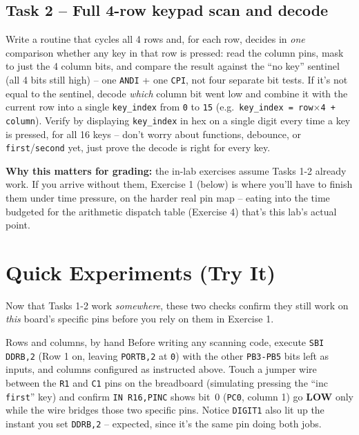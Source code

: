 \documentclass[11pt]{article}
\begin{document}
\subsection*{Task 2 -- Full 4-row keypad scan and decode}
Write a routine that cycles all 4 rows and, for each row, decides in \emph{one}
comparison whether any key in that row is pressed: read the column pins, mask
to just the 4 column bits, and compare the result against the ``no key''
sentinel (all 4 bits still high) -- one \texttt{ANDI} + one \texttt{CPI}, not
four separate bit tests. If it's not equal to the sentinel, decode \emph{which}
column bit went low and combine it with the current row into a single
\texttt{key\_index} from \texttt{0} to \texttt{15} (e.g.\
\texttt{key\_index = row}$\times$\texttt{4 + column}). Verify by displaying
\texttt{key\_index} in hex on a single digit every time a key is pressed, for
all 16 keys -- don't worry about functions, debounce, or
\texttt{first}/\texttt{second} yet, just prove the decode is right for every
key.

\medskip
\textbf{Why this matters for grading:} the in-lab exercises assume Tasks 1-2
already work. If you arrive without them, Exercise 1 (below) is where you'll
have to finish them under time pressure, on the harder real pin map -- eating
into the time budgeted for the arithmetic dispatch table (Exercise 4) that's
this lab's actual point.

\section*{Quick Experiments (Try It)}
Now that Tasks 1-2 work \emph{somewhere}, these two checks confirm they still
work on \emph{this} board's specific pins before you rely on them in Exercise 1.

\begin{tryit}{Rows and columns, by hand}
Before writing any scanning code, execute \texttt{SBI DDRB,2} (Row 1 on, leaving
\texttt{PORTB,2} at \texttt{0}) with the other \texttt{PB3-PB5} bits left as
inputs, and columns configured as instructed above. Touch a jumper wire between
the \texttt{R1} and \texttt{C1} pins on the breadboard (simulating pressing the
``inc \texttt{first}'' key) and confirm \texttt{IN R16,PINC} shows bit~0
(\texttt{PC0}, column 1) go \textbf{LOW} only while the wire bridges those two
specific pins. Notice \texttt{DIGIT1} also lit up the instant you set
\texttt{DDRB,2} -- expected, since it's the same pin doing both jobs.
\end{tryit}
\end{document}
